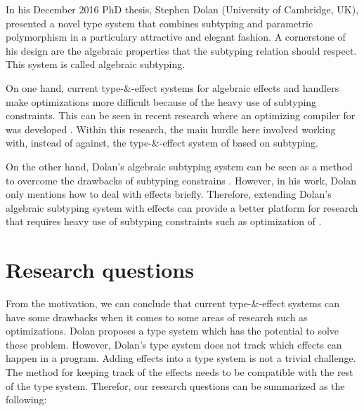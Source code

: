 In his December 2016 PhD thesis, Stephen Dolan (University of Cambridge, UK), presented a novel type system that combines subtyping and parametric polymorphism in a particulary attractive and elegant fashion. A cornerstone of his design are the algebraic properties that the subtyping relation should respect. This system is called algebraic subtyping. \cite{mlsub}

On one hand, current type-\&-effect systems for algebraic effects and handlers make optimizations more difficult because of 
the heavy use of subtyping constraints. This can be seen in recent research where an optimizing compiler for \eff was developed \cite{optimization}. Within this research, the main hurdle here involved working with, instead of against, the type-\&-effect system of \eff based on subtyping. 

On the other hand, Dolan's algebraic subtyping system can be seen as a method to overcome the drawbacks of subtyping constrains . However, in his work, Dolan only mentions how to deal with effects briefly. Therefore, extending Dolan's algebraic subtyping system with effects can provide a better platform for research that requires heavy use of subtyping constraints such as optimization of \eff.


\section{Research questions}
From the motivation, we can conclude that current type-\&-effect systems can have some drawbacks when it comes to some areas of research such as optimizations. Dolan proposes a type system which has the potential to solve these problem. However, Dolan's type system does not track which effects can happen in a program. Adding effects into a type system is not a trivial challenge. The method for keeping track of the effects needs to be compatible with the rest of the type system. Therefor, our research questions can be summarized as the following:

